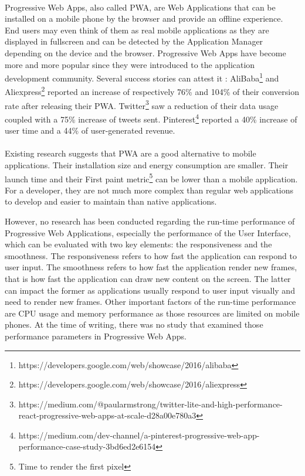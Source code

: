 \documentclass{kththesis}
\begin{document}
\paragraph{}
Progressive Web Apps, also called PWA, are Web Applications that can be installed on a mobile phone by the browser and provide an offline experience. End users may even think of them as real mobile applications as they are displayed in fullscreen and can be detected by the Application Manager depending on the device and the browser.
Progressive Web Apps have become more and more popular since they were introduced to the application development community. Several success stories can attest it : AliBaba\footnote{https://developers.google.com/web/showcase/2016/alibaba} and Aliexpress\footnote{https://developers.google.com/web/showcase/2016/aliexpress} reported an increase of respectively 76\% and 104\% of their conversion rate after releasing their PWA. Twitter\footnote{https://medium.com/@paularmstrong/twitter-lite-and-high-performance-react-progressive-web-apps-at-scale-d28a00e780a3} saw a reduction of their data usage coupled with a 75\% increase of tweets sent. Pinterest\footnote{https://medium.com/dev-channel/a-pinterest-progressive-web-app-performance-case-study-3bd6ed2e6154} reported a 40\% increase of user time and a 44\% of user-generated revenue.

\paragraph{}
Existing research suggests that PWA are a good alternative to mobile applications. Their installation size and energy consumption are  smaller\cite{PWAapplicability}. Their launch time \cite{Biorn-Hansen2} and their First paint metric\footnote{Time to render the first pixel}\cite{PWAapplicability} can be lower than a mobile application. For a developer, they are not much more complex than regular web applications to develop\cite{JohannsenFabian2018PWAa} and easier to maintain than native applications. \newline

However, no research has been conducted regarding the run-time performance of Progressive Web Applications, especially the performance of the User Interface, which can be evaluated with two key elements: the responsiveness and the smoothness. The responsiveness refers to how fast the application can respond to user input. The smoothness refers to how fast the application render new frames, that is how fast the application can draw new content on the screen. The latter can impact the former as applications usually respond to user input visually and need to render new frames. Other important factors of the run-time performance are CPU usage and memory performance as those resources are limited on mobile phones. At the time of writing, there was no study that examined those performance parameters in Progressive Web Apps.
\end{document}
